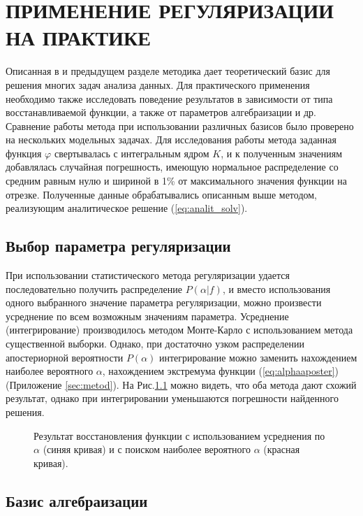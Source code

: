 \chapter{ПРИМЕНЕНИЕ РЕГУЛЯРИЗАЦИИ НА ПРАКТИКЕ}

Описанная в \cite{turchin} и предыдущем разделе методика дает теоретический базис для решения многих задач анализа данных. Для практического применения необходимо также исследовать поведение результатов в зависимости от типа восстанавливаемой функции, а также от параметров алгебраизации и др. Сравнение работы метода при использовании различных базисов было проверено на нескольких модельных задачах. Для исследования работы метода заданная функция $\varphi$ свертывалась с интегральным ядром $K$, и к полученным значениям добавлялась случайная погрешность, имеющую нормальное распределение со средним равным нулю и шириной в 1\% от максимального значения функции на отрезке. Полученные данные обрабатывались описанным выше методом, реализующим аналитическое решение (\ref{eq:analit_solv}).


\section{Выбор параметра регуляризации}

При использовании статистического метода регуляризации удается последовательно получить распределение $P(\alpha | f)$, и вместо использования одного выбранного значение параметра регуляризации, можно произвести усреднение по всем возможным значениям параметра. Усреднение (интегрирование) производилось методом Монте-Карло с использованием метода существенной выборки. Однако, при достаточно узком распределении апостериорной вероятности $P(\alpha)$ интегрирование можно заменить нахождением наиболее вероятного $\alpha$, нахождением экстремума функции (\ref{eq:alphaaposter}) (Приложение \ref{sec:metod}). На Рис.\ref{pic:13} можно видеть, что оба метода дают схожий результат, однако при интегрировании уменьшаются погрешности найденного решения.

\begin{figure}[h! ]
	\label{pic:13}
	\caption{Результат восстановления функции с использованием усреднения по $\alpha$ (синяя кривая) и с поиском наиболее вероятного $\alpha$ (красная кривая).}
\end{figure}

\section{Базис алгебраизации}

